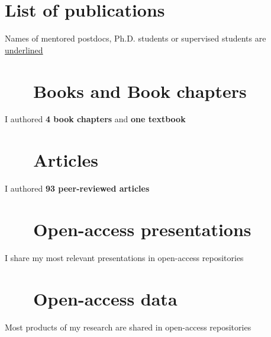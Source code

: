\documentclass[%
               doublesided,
               paper=a4,
               fontsize=10pt
              ]{my-resume}
\begin{document}
\clearpage

\pagestyle{empty}

\section[\faAreaChart]{List of publications}
Names of mentored postdocs, Ph.D. students or supervised students are \underline{underlined}

\nocite{*}
\section{\faBook \ \ \ Books and Book chapters}
I authored \textbf{4 book chapters} and \textbf{one textbook}
\printbibliography[type=book,heading=none]
\section{\faFileTextO \ \ \  Articles}
I authored \textbf{93 peer-reviewed articles}
\printbibliography[type=article,heading=none]
\section{\faFileTextO \ \ \  Open-access presentations}
I share my most relevant presentations in open-access repositories 
\printbibliography[type=misc,heading=none]
\section{\faFileTextO \ \ \  Open-access data}
Most products of my research are shared in open-access repositories
\printbibliography[type=dataset,heading=none]


\end{document}
